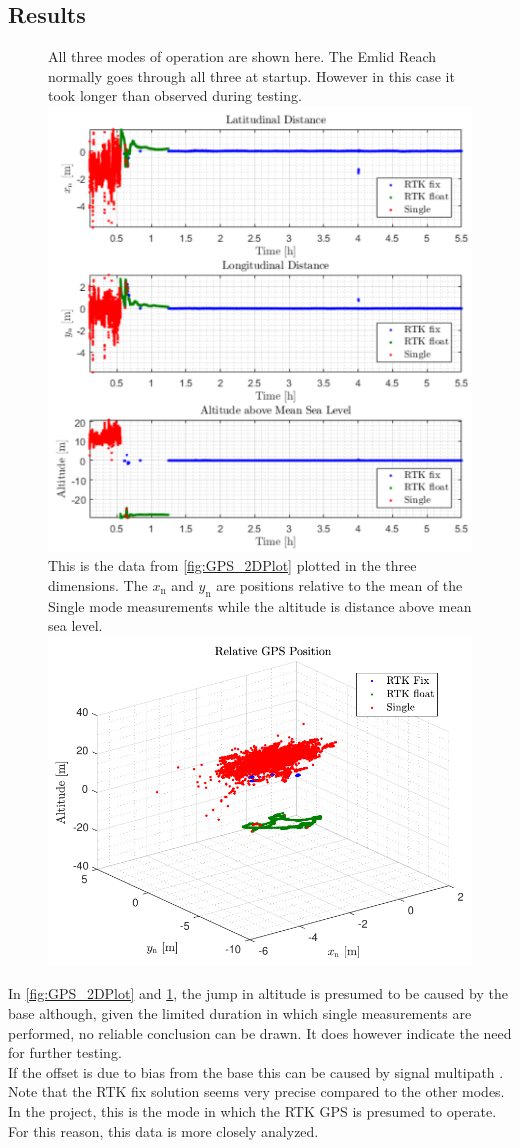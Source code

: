 \subsection*{Results}

\begin{figure}[H]
  \captionbox
  {
    All three modes of operation are shown here. The Emlid Reach normally goes through all three at startup. However in this case it took longer than observed during testing.
    \label{fig:GPS_2DPlot}
  }
  {
    \includegraphics[width=.45\textwidth]{figures/GPS_2DPlot}
  }
  \hspace{5pt}
  \captionbox
  {
    This is the data from \autoref{fig:GPS_2DPlot} plotted in the three dimensions. The $x_\mathrm{n}$ and $y_\mathrm{n}$ are positions relative to the mean of the Single mode measurements while the altitude is distance above mean sea level.
    \label{fig:GPS_3DPlot}
  }
  {
    \includegraphics[width=.45\textwidth]{figures/GPS_3DPlot}
    \vspace{1cm}
  }
\end{figure}

In \autoref{fig:GPS_2DPlot} and \ref{fig:GPS_3DPlot}, the jump in altitude is presumed to be caused by the base although, given the limited duration in which single measurements are performed, no reliable conclusion can be drawn. It does however indicate the need for further testing.\\
If the offset is due to bias from the base this can be caused by signal multipath \cite{reflection}.\\
Note that the RTK fix solution seems very precise compared to the other modes. In the project, this is the mode in which the RTK GPS is presumed to operate. For this reason, this data is more closely analyzed.

